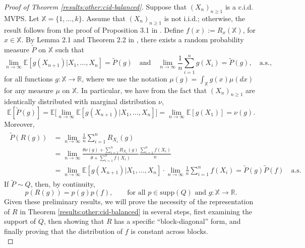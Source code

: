 \documentclass[a4paper]{article}
\theoremstyle{plain}
\theoremstyle{remark}
\theoremstyle{definition}
\begin{document}
\begin{proof}[Proof of Theorem \ref{results:other:cid-balanced}]
Suppose that $(X_n)_{n\geq1}$ is a c.i.d. MVPS. Let $\mathbb{X}=\{1,\ldots,k\}$. Assume that $(X_n)_{n\geq1}$ is not i.i.d.; otherwise, the result follows from the proof of Proposition 3.1 in \cite{sariev2024}. Define $f(x):=R_x(\mathbb{X})$, for $x\in\mathbb{X}$. By Lemma 2.1 and Theorem 2.2 in \cite{berti2004limit}, there exists a random probability measure $\tilde{P}$ on $\mathbb{X}$ such that
\[\lim_{n\rightarrow\infty}\mathbb{E}[g(X_{n+1})|X_1,\ldots,X_n]=\tilde{P}(g)\quad\mbox{and}\quad\lim_{n\rightarrow\infty}\frac{1}{n}\sum_{i=1}^ng(X_i)=\tilde{P}(g),\quad\mbox{a.s.},\]
for all functions $g:\mathbb{X}\rightarrow\mathbb{R}$, where we use the notation $\mu(g)=\int_\mathbb{X}g(x)\mu(dx)$ for any measure $\mu$ on $\mathbb{X}$. In particular, we have from the fact that $(X_n)_{n\geq1}$ are identically distributed with marginal distribution $\nu$,
\begin{equation}\label{proof:results:other:cid-balanced:eq0}
\mathbb{E}[\tilde{P}(g)]=\mathbb{E}\bigl[\lim_{n\rightarrow\infty}\mathbb{E}[g(X_{n+1})|X_1,\ldots,X_n]\bigr]=\lim_{n\rightarrow\infty}\mathbb{E}[g(X_1)]=\nu(g).
\end{equation}
Moreover,
\begingroup\allowdisplaybreaks
\begin{align}\label{proof:results:other:cid-balanced:eq1}
\begin{aligned}
\tilde{P}(R(g))&=\lim_{n\rightarrow\infty}\frac{1}{n}\sum_{i=1}^nR_{X_i}(g)\\
&=\lim_{n\rightarrow\infty}\frac{\theta\nu(g)+\sum_{i=1}^nR_{X_i}(g)}{\theta+\sum_{i=1}^nf(X_i)}\frac{\sum_{i=1}^nf(X_i)}{n}\\
&=\lim_{n\rightarrow\infty}\mathbb{E}[g(X_{n+1})|X_1,\ldots,X_n]\cdot\lim_{n\rightarrow\infty}\frac{1}{n}\sum_{i=1}^nf(X_i)=\tilde{P}(g)\tilde{P}(f)\quad\mbox{a.s.}
\end{aligned}
\end{align}
\endgroup
If $\tilde{P}\sim Q$, then, by continuity,
\begin{equation}\label{proof:results:other:cid-balanced:eq2}
p(R(g))=p(g)p(f),\qquad\mbox{for all }p\in\mbox{supp}(Q)\mbox{ and }g:\mathbb{X}\rightarrow\mathbb{R}.
\end{equation}
Given these preliminary results, we will prove the necessity of the representation of $R$ in Theorem \ref{results:other:cid-balanced} in several steps, first examining the support of $Q$, then showing that $R$ has a specific ``block-diagonal'' form, and finally proving that the distribution of $f$ is constant across blocks.\\


\end{proof}
\end{document}
